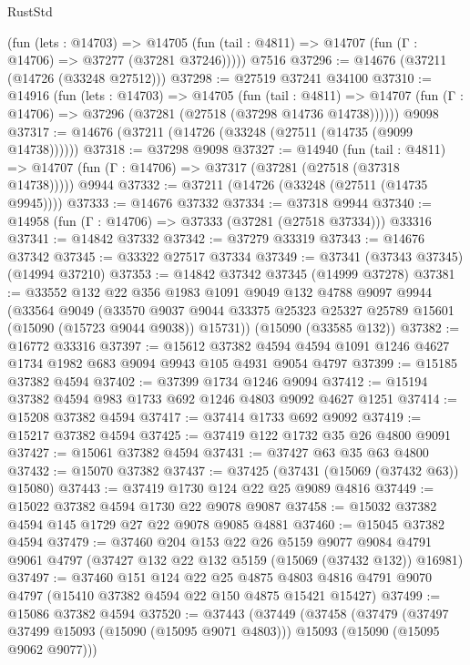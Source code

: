 \begin{lexlean}{RustStd}
\begin{coremodule}
      (fun (lets : @14703) =>
      @14705 (fun (tail : @4811) => @14707 (fun (Γ : @14706) => @37277 (@37281 @37246)))))
    @7516
@37296 := @14676 (@37211 (@14726 (@33248 @27512)))
@37298 := @27519 @37241 @34100
@37310 := @14916
    (fun (lets : @14703) =>
    @14705
      (fun (tail : @4811) =>
      @14707 (fun (Γ : @14706) => @37296 (@37281 (@27518 (@37298 @14736 @14738))))))
    @9098
@37317 := @14676 (@37211 (@14726 (@33248 (@27511 (@14735 (@9099 @14738))))))
@37318 := @37298 @9098
@37327 := @14940
    (fun (tail : @4811) => @14707 (fun (Γ : @14706) => @37317 (@37281 (@27518 (@37318 @14738)))))
    @9944
@37332 := @37211 (@14726 (@33248 (@27511 (@14735 @9945))))
@37333 := @14676 @37332
@37334 := @37318 @9944
@37340 := @14958 (fun (Γ : @14706) => @37333 (@37281 (@27518 @37334))) @33316
@37341 := @14842 @37332
@37342 := @37279 @33319
@37343 := @14676 @37342
@37345 := @33322 @27517 @37334
@37349 := @37341 (@37343 @37345) (@14994 @37210)
@37353 := @14842 @37342 @37345 (@14999 @37278)
@37381 := @33552
    @132
    @22
    @356
    @1983
    @1091
    @9049
    @132
    @4788
    @9097
    @9944
    (@33564
      @9049
      (@33570 @9037 @9044 @33375 @25323 @25327 @25789 @15601 (@15090 (@15723 @9044 @9038)) @15731))
    (@15090 (@33585 @132))
@37382 := @16772 @33316
@37397 := @15612
    @37382
    @4594
    @4594
    @1091
    @1246
    @4627
    @1734
    @1982
    @683
    @9094
    @9943
    @105
    @4931
    @9054
    @4797
@37399 := @15185 @37382 @4594
@37402 := @37399 @1734 @1246 @9094
@37412 := @15194 @37382 @4594 @983 @1733 @692 @1246 @4803 @9092 @4627 @1251
@37414 := @15208 @37382 @4594
@37417 := @37414 @1733 @692 @9092
@37419 := @15217 @37382 @4594
@37425 := @37419 @122 @1732 @35 @26 @4800 @9091
@37427 := @15061 @37382 @4594
@37431 := @37427 @63 @35 @63 @4800
@37432 := @15070 @37382
@37437 := @37425 (@37431 (@15069 (@37432 @63)) @15080)
@37443 := @37419 @1730 @124 @22 @25 @9089 @4816
@37449 := @15022 @37382 @4594 @1730 @22 @9078 @9087
@37458 := @15032 @37382 @4594 @145 @1729 @27 @22 @9078 @9085 @4881
@37460 := @15045 @37382 @4594
@37479 := @37460
    @204
    @153
    @22
    @26
    @5159
    @9077
    @9084
    @4791
    @9061
    @4797
    (@37427 @132 @22 @132 @5159 (@15069 (@37432 @132)) @16981)
@37497 := @37460
    @151
    @124
    @22
    @25
    @4875
    @4803
    @4816
    @4791
    @9070
    @4797
    (@15410 @37382 @4594 @22 @150 @4875 @15421 @15427)
@37499 := @15086 @37382 @4594
@37520 := @37443
    (@37449
      (@37458
        (@37479
          (@37497 @37499 @15093 (@15090 (@15095 @9071 @4803)))
          @15093
          (@15090 (@15095 @9062 @9077)))

\end{coremodule}
\end{lexlean}
